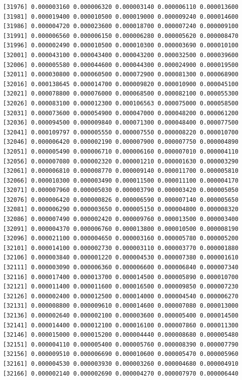 \documentclass[]{article}
\begin{document}
\begin{verbatim}
[31976] 0.000003160 0.000006320 0.000003140 0.000006110 0.000013600
[31981] 0.000019400 0.000010500 0.000019000 0.000009240 0.000014600
[31986] 0.000004720 0.000023600 0.000018700 0.000007240 0.000009100
[31991] 0.000006560 0.000006150 0.000006280 0.000005620 0.000008470
[31996] 0.000002490 0.000010500 0.000010300 0.000003690 0.000010100
[32001] 0.000043100 0.000043400 0.000043200 0.000032500 0.000039600
[32006] 0.000005580 0.000044600 0.000044300 0.000024900 0.000019500
[32011] 0.000030800 0.000060500 0.000072900 0.000081300 0.000068900
[32016] 0.000138645 0.000014700 0.000009820 0.000010900 0.000045100
[32021] 0.000078800 0.000076000 0.000068500 0.000082100 0.000055300
[32026] 0.000083100 0.000012300 0.000106563 0.000075000 0.000058500
[32031] 0.000073600 0.000054900 0.000047000 0.000048200 0.000061200
[32036] 0.000094500 0.000009840 0.000071300 0.000048400 0.000077500
[32041] 0.000109797 0.000005550 0.000007550 0.000008220 0.000010700
[32046] 0.000006420 0.000002190 0.000007900 0.000007750 0.000004890
[32051] 0.000005490 0.000006710 0.000006160 0.000007010 0.000004110
[32056] 0.000007080 0.000002320 0.000001210 0.000001630 0.000003290
[32061] 0.000006810 0.000008770 0.000009140 0.000011700 0.000005810
[32066] 0.000010300 0.000003490 0.000011500 0.000011100 0.000004170
[32071] 0.000007960 0.000005030 0.000003790 0.000003420 0.000005050
[32076] 0.000006420 0.000000826 0.000006590 0.000007140 0.000005650
[32081] 0.000006290 0.000003650 0.000005150 0.000004800 0.000008320
[32086] 0.000007490 0.000002420 0.000009760 0.000013500 0.000003400
[32091] 0.000004370 0.000006760 0.000013800 0.000010500 0.000008190
[32096] 0.000021100 0.000004650 0.000003160 0.000005780 0.000005200
[32101] 0.000014100 0.000002730 0.000003110 0.000003770 0.000001880
[32106] 0.000003840 0.000001220 0.000004530 0.000007380 0.000001610
[32111] 0.000003090 0.000006360 0.000006600 0.000006840 0.000007340
[32116] 0.000017400 0.000013700 0.000014500 0.000005890 0.000010700
[32121] 0.000011400 0.000011600 0.000016500 0.000009850 0.000007230
[32126] 0.000002400 0.000012500 0.000014000 0.000004540 0.000006270
[32131] 0.000008800 0.000009610 0.000014600 0.000007080 0.000013000
[32136] 0.000002640 0.000002100 0.000003600 0.000005400 0.000014500
[32141] 0.000014400 0.000012100 0.000016100 0.000007860 0.000011300
[32146] 0.000015000 0.000015200 0.000004440 0.000008680 0.000005480
[32151] 0.000004110 0.000005400 0.000005760 0.000008390 0.000007790
[32156] 0.000009510 0.000006690 0.000010600 0.000005470 0.000005960
[32161] 0.000004530 0.000003930 0.000003260 0.000004680 0.000004910
[32166] 0.000002140 0.000002690 0.000004270 0.000007970 0.000006440

\end{verbatim}
\end{document}
